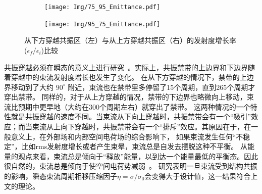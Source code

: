 \begin{figure}[thbp]
    \centering
    \begin{subfigure}[b]{0.48\textwidth}
        \centering
        \texttt{[image: Img/75\_95\_Emittance.pdf]}
        \caption{}
        \label{sfig:75_95emittance}
    \end{subfigure}
    \begin{subfigure}[b]{0.48\textwidth}
        \centering
        \texttt{[image: Img/95\_75\_Emittance.pdf]}
        \caption{}
        \label{sfig:95_75emittance}
    \end{subfigure}
    \caption{从下方穿越共振区（左）与从上方穿越共振区（右）的发射度增长率($\epsilon_f/\epsilon_i$)比较
     }
    \label{fig:emittance}
\end{figure}

共振穿越必须在瞬态的意义上进行研究~\cite{li2018structure}。实际上，共振禁带的上边界和下边界随着穿越中的束流发射度增长也发生了变化。
在从下方穿越的情况下，禁带的上边界移动到了大约 $90^{\circ}$ 附近，束流也在禁带里多停留了15个周期，直到265个周期才穿出禁带。
同样的，对于从上方穿越的情况，禁带的下边界也略微向上移动，束流比预期中更早地（大约在300个周期左右）就穿出了禁带。
这两种情况的一个特性就是共振穿越的速度不同。当束流从下向上穿越时，共振禁带会有一个“吸引”效应；而当束流从上向下穿越时，共振禁带会有一个“排斥”效应。其原因在于，在一般意义上，在外部场和内部空间电荷场的综合影响下，
如果束流发生任何“不稳定”，比如rms发射度增长或者产生束晕，束流总是自发去摆脱这种不平衡。
从能量的观点来看，束流总是倾向于“释放”能量，以到达一个能量最低的平衡态。因此很自然的，束流总是倾向于使空间电荷势减弱~\cite{li2014envelope}。
研究表明一旦束流受到结构共振的影响，瞬态束流周期相移压缩因子$\eta=\sigma/\sigma_0$会变得大于设计值，这一结果符合上文的理论。


